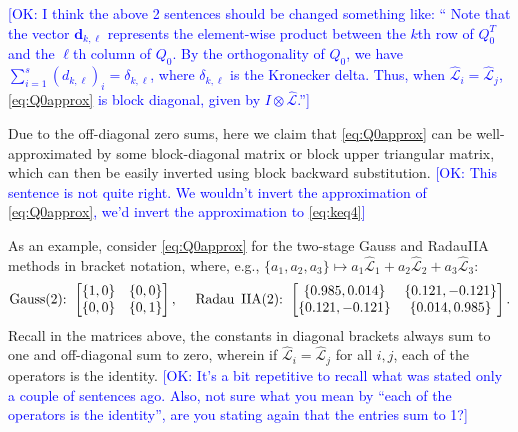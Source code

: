 \documentclass[review]{siamart}
\newcommand{\OK}[1]{\textcolor{blue}{[OK: #1]}}
\begin{document}
%
\OK{
I think the above 2 sentences should be changed something like: ``
Note that the vector $\bm{d}_{k, \ell}$ represents the element-wise product between the $k$th row of $Q_0^T$ and the $\ell$th column of $Q_0$. By the orthogonality of $Q_0$, we have $\sum_{i = 1}^s (d_{k, \ell})_i = \delta_{k,\ell}$, where $\delta_{k,\ell}$ is the Kronecker delta. Thus, when $\widehat{\mathcal{L}}_i = \widehat{\mathcal{L}}_j$, \eqref{eq:Q0approx}
is block diagonal, given by $I\otimes\widehat{\mathcal{L}}$.''}
%

Due to the off-diagonal zero sums, here we claim that \eqref{eq:Q0approx}
can be well-approximated by some block-diagonal matrix or block upper triangular
matrix, which can then be easily inverted using block backward
substitution.
%
\OK{This sentence is not quite right. We wouldn't invert the approximation of \eqref{eq:Q0approx}, we'd invert the approximation to \eqref{eq:keq4}}
%

As an example, consider \eqref{eq:Q0approx} for the two-stage Gauss and
RadauIIA methods in bracket notation, where, e.g., $\{a_1,a_2,a_3\}\mapsto
a_1\widehat{\mathcal{L}}_1 + a_2\widehat{\mathcal{L}}_2 + a_3\widehat{\mathcal{L}}_3$:
%
\begin{align*}
\textnormal{Gauss(2):} \hspace{1ex}
	\begin{bmatrix}
	\{1,0\} & \{0,0\} \\
	 \{0,0\} & \{0,1\} \\
	\end{bmatrix},
	\hspace{3ex}
\textnormal{Radau\, IIA(2):} \hspace{1ex}
	\begin{bmatrix}
	\{0.985,0.014\} & \{0.121,-0.121\}\\
	\{0.121,-0.121\} & \{0.014,0.985\}\\
	\end{bmatrix}.
\end{align*}
%
Recall in the matrices above, the constants in diagonal brackets always sum to
one and off-diagonal sum to zero, wherein if $\widehat{\mathcal{L}}_i = \widehat{\mathcal{L}}_j$
for all $i,j$, each of the operators is the identity.
%
\OK{It's a bit repetitive to recall what was stated only a couple of sentences ago. Also, not sure what you mean by ``each of the operators is the identity'', are you stating again that the entries sum to 1?}
%
\end{document}

